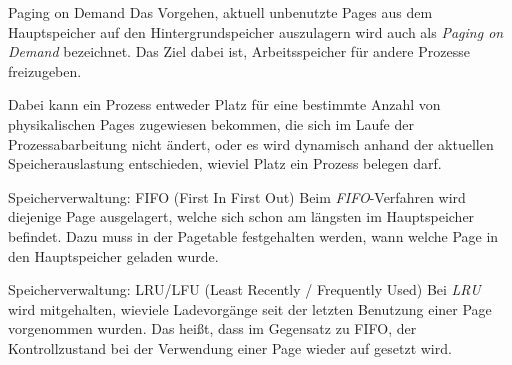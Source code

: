 \documentclass[german]{spicker}
\begin{document}
\begin{bonus}{Paging on Demand}
    Das Vorgehen, aktuell
    unbenutzte Pages aus dem Hauptspeicher auf den Hintergrundspeicher auszulagern
    wird auch als \emph{Paging on Demand} bezeichnet.
    Das Ziel dabei ist, Arbeitsspeicher
    für andere Prozesse freizugeben.

    Dabei kann ein Prozess entweder Platz für eine
    bestimmte Anzahl von physikalischen Pages zugewiesen bekommen, die sich im
    Laufe der Prozessabarbeitung nicht ändert, oder es wird dynamisch anhand der aktuellen
    Speicherauslastung entschieden, wieviel Platz ein Prozess belegen darf.
\end{bonus}

\begin{algo}{Speicherverwaltung: FIFO (First In First Out)}
    Beim \emph{FIFO}-Verfahren wird
    diejenige Page ausgelagert, welche sich schon am längsten im Hauptspeicher
    befindet. Dazu muss in der Pagetable festgehalten werden, wann welche
    Page in den Hauptspeicher geladen wurde.
\end{algo}

\begin{algo}{Speicherverwaltung: LRU/LFU (Least Recently / Frequently Used)}
    Bei \emph{LRU}
    wird mitgehalten, wieviele Ladevorgänge seit der letzten Benutzung einer
    Page vorgenommen wurden. Das heißt, dass im Gegensatz zu FIFO, der
    Kontrollzustand bei der Verwendung einer Page wieder auf \grqq gesetzt wird.
\end{algo}
\end{document}
